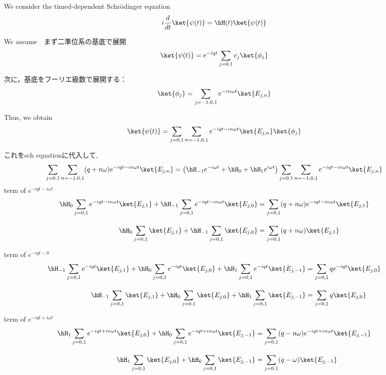 We consider the timed-dependent Schr\"{o}dinger equation
\begin{equation}
    i\frac{d}{dt}\ket{\psi(t)}=\hH(t)\ket{\psi(t)}
\end{equation}

We assume　まず二準位系の基底で展開
\begin{equation}
    \ket{\psi(t)} = e^{-iqt}\sum_{j=0,1} c_j
    \ket{\phi_j}
\end{equation}

次に，基底をフーリエ級数で展開する：
\begin{equation}
    \ket{\phi_j} = \sum_{j=-1,0,1} e^{-in\omega t}\ket{E_{j,n}}
\end{equation}

Thus, we obtain 
\begin{equation}
    \ket{\psi(t)} =\sum_{j=0,1} \sum_{n=-1,0,1} e^{-iqt-in\omega t}\ket{E_{j,n}}
    \ket{\phi_j}
\end{equation}

これをsch equationに代入して,
\begin{align}
    \sum_{j=0,1} \sum_{n=-1,0,1} 
    (q+n\omega)
    e^{-iqt-in\omega t}\ket{E_{j,n}}
    =\left(
    \hH_{-1}e^{-i\omega t} + \hH_0 +\hH_1 e^{i\omega t}
    \right)
    \sum_{j=0,1} \sum_{n=-1,0,1} e^{-iqt-in\omega t}\ket{E_{j,n}}
\end{align}
term of $e^{-iqt-i\omega t}$
\begin{align}
    \hH_0\sum_{j=0,1} e^{-iqt-in\omega t}\ket{E_{j,1}}
    +\hH_{-1}\sum_{j=0,1}e^{-iqt-in\omega t}\ket{E_{j,0}}
    &=\sum_{j=0,1}
    (q+n\omega)
    e^{-iqt-in\omega t}\ket{E_{j,{1}}}\\[10pt]
    \hH_0\sum_{j=0,1} \ket{E_{j,1}}
    +\hH_{-1}\sum_{j=0,1}\ket{E_{j,0}}
    &=\sum_{j=0,1}
    (q+n\omega)
    \ket{E_{j,{1}}}
\end{align}

term of $e^{-iqt-0}$
\begin{align}
    \hH_{-1}\sum_{j=0,1} e^{-iqt}\ket{E_{j,1}}
    +\hH_{0}\sum_{j=0,1} e^{-iqt}\ket{E_{j,0}}
    +\hH_{1}\sum_{j=0,1}e^{-iqt}\ket{E_{j,{-1}}}
    &=\sum_{j=0,1}q
    e^{-iqt}\ket{E_{j,{0}}}\\[10pt]
    \hH_{-1}\sum_{j=0,1} \ket{E_{j,1}}
    +\hH_{0}\sum_{j=0,1} \ket{E_{j,0}}
    +\hH_{1}\sum_{j=0,1}\ket{E_{j,{-1}}}
    &=\sum_{j=0,1}
    q\ket{E_{j,{0}}}
\end{align}

term of $e^{-iqt+i\omega t}$
\begin{align}
    \hH_1\sum_{j=0,1} e^{-iqt+in\omega t}\ket{E_{j,0}}
    +\hH_{0}\sum_{j=0,1}e^{-iqt+in\omega t}\ket{E_{j,{-1}}}
    &=\sum_{j=0,1}
    (q-n\omega)
    e^{-iqt+in\omega t}\ket{E_{j,{-1}}}\\[10pt]
    \hH_1\sum_{j=0,1} \ket{E_{j,0}}
    +\hH_{0}\sum_{j=0,1}\ket{E_{j,{-1}}}
    &=\sum_{j=0,1}
    (q-\omega)\ket{E_{j,{-1}}}
\end{align}

